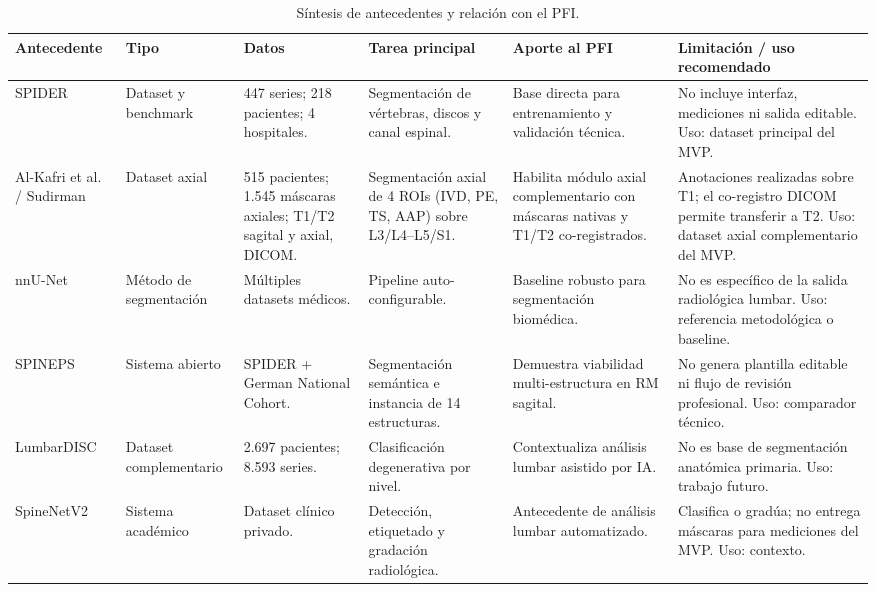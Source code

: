 \begin{table}[p]
\centering
\scriptsize
\setlength{\tabcolsep}{2pt}
\renewcommand{\arraystretch}{1.04}
\caption{Síntesis de antecedentes y relación con el PFI.}
\label{tab:sintesis_antecedentes_pfi}
\begin{tabularx}{\textwidth}{p{} p{} p{} p{} p{} p{}}
\hline
\textbf{Antecedente} & \textbf{Tipo} & \textbf{Datos} & \textbf{Tarea principal} & \textbf{Aporte al PFI} & \textbf{Limitación / uso recomendado} \\
\hline
SPIDER \parencite{vandergraaf_spider_2024} & Dataset y benchmark & 447 series; 218 pacientes; 4 hospitales. & Segmentación de vértebras, discos y canal espinal. & Base directa para entrenamiento y validación técnica. & No incluye interfaz, mediciones ni salida editable. Uso: dataset principal del MVP. \\
Al-Kafri et al. / Sudirman \parencite{alkafri_sudirman_boundary_2019} & Dataset axial & 515 pacientes; 1.545 máscaras axiales; T1/T2 sagital y axial, DICOM. & Segmentación axial de 4 ROIs (IVD, PE, TS, AAP) sobre L3/L4--L5/S1. & Habilita módulo axial complementario con máscaras nativas y T1/T2 co-registrados. & Anotaciones realizadas sobre T1; el co-registro DICOM permite transferir a T2. Uso: dataset axial complementario del MVP. \\
nnU-Net \parencite{isensee_nnunet_2021} & Método de segmentación & Múltiples datasets médicos. & Pipeline auto-configurable. & Baseline robusto para segmentación biomédica. & No es específico de la salida radiológica lumbar. Uso: referencia metodológica o baseline. \\
SPINEPS \parencite{moller_spineps_2025} & Sistema abierto & SPIDER + German National Cohort. & Segmentación semántica e instancia de 14 estructuras. & Demuestra viabilidad multi-estructura en RM sagital. & No genera plantilla editable ni flujo de revisión profesional. Uso: comparador técnico. \\
LumbarDISC \parencite{richards_lumbardisc_2026} & Dataset complementario & 2.697 pacientes; 8.593 series. & Clasificación degenerativa por nivel. & Contextualiza análisis lumbar asistido por IA. & No es base de segmentación anatómica primaria. Uso: trabajo futuro. \\
SpineNetV2 \parencite{jamaludin_spinenet_2017,windsor_spinenet_2024} & Sistema académico & Dataset clínico privado. & Detección, etiquetado y gradación radiológica. & Antecedente de análisis lumbar automatizado. & Clasifica o gradúa; no entrega máscaras para mediciones del MVP. Uso: contexto. \\

\end{tabularx}
\end{table}
